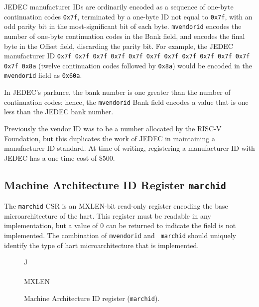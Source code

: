 JEDEC manufacturer IDs are ordinarily encoded as a sequence of one-byte
continuation codes {\tt 0x7f}, terminated by a one-byte ID not equal to
{\tt 0x7f}, with an odd parity bit in the most-significant bit of each byte.
{\tt mvendorid} encodes the number of one-byte continuation
codes in the Bank field, and encodes the final byte in the Offset field,
discarding the parity bit.  For example, the JEDEC manufacturer ID
{\tt 0x7f 0x7f 0x7f 0x7f 0x7f 0x7f 0x7f 0x7f 0x7f 0x7f 0x7f 0x7f 0x8a}
(twelve continuation codes followed by {\tt 0x8a}) would be encoded in the
{\tt mvendorid} field as {\tt 0x60a}.

\begin{commentary}
In JEDEC's parlance, the bank number is one greater than the number of
continuation codes; hence, the {\tt mvendorid} Bank field encodes a value
that is one less than the JEDEC bank number.
\end{commentary}

\begin{commentary}
Previously the vendor ID was to be a number allocated by the RISC-V
Foundation, but this duplicates the work of JEDEC in maintaining a
manufacturer ID standard.  At time of writing, registering a
manufacturer ID with JEDEC has a one-time cost of \$500.
\end{commentary}

\subsection{Machine Architecture ID Register {\tt marchid}}

The {\tt marchid} CSR is an MXLEN-bit read-only register encoding the
base microarchitecture of the hart.  This register must be readable in
any implementation, but a value of 0 can be returned to indicate the
field is not implemented.  The combination of {\tt mvendorid} and {\tt
  marchid} should uniquely identify the type of hart microarchitecture
that is implemented.

\begin{figure*}[h!]
{\footnotesize
\begin{center}
\begin{tabular}{J}
 \\
\hline
{} \\
\hline
MXLEN \\
\end{tabular}
\end{center}
}
\vspace{-0.1in}
\caption{Machine Architecture ID register ({\tt marchid}).}
\label{marchreg}
\end{figure*}


